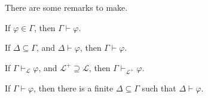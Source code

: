 There are some remarks to make.

\begin{remark}
	If \(\varphi \in \Gamma \), then \(\Gamma \vdash \varphi \).
\end{remark}

\begin{remark}
	If \(\Delta \subseteq \Gamma \), and \(\Delta \vdash \varphi \), then \(\Gamma \vdash \varphi \).
\end{remark}

\begin{remark}
	If \(\Gamma \vdash _{\mathcal{L} } \varphi \), and \(\mathcal{L} ^+ \supseteq \mathcal{L}  \), then \(\Gamma \vdash _{\mathcal{L} ^+} \varphi \).
\end{remark}

\begin{remark}
	If \(\Gamma \vdash \varphi \), then there is a finite \(\Delta \subseteq \Gamma \) such that \(\Delta \vdash \varphi \).
\end{remark}

